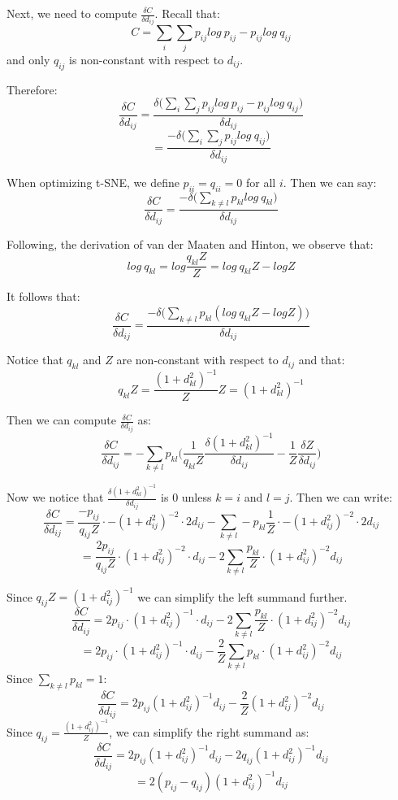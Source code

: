\documentclass[a4paper]{article}
\begin{document}
\begin{enumerate}
{Next, we need to compute $ \frac{\delta C }{\delta d_{ij}} $. Recall that: 
$$C = \sum_i \sum_j p_{ij} log\ p_{ij} - p_{ij} log\ q_{ij}$$
and only $q_{ij}$ is non-constant with respect to $d_{ij}$. 

Therefore: 
$$\frac{ \delta C }{\delta d_{ij} } = \frac{ \delta \Big( \sum_i \sum_j p_{ij} log\ p_{ij} - p_{ij} log\ q_{ij} \Big) }{\delta d_{ij} } $$
$$ = \frac{ - \delta \Big( \sum_i \sum_j p_{ij} log\ q_{ij} \Big) }{\delta d_{ij} } $$

When optimizing t-SNE, we define $p_{ii} = q_{ii} = 0$ for all $i$. Then we can say:
$$\frac{ \delta C }{\delta d_{ij} } = \frac{ - \delta \Big( \sum_{k \neq l} p_{kl} log\ q_{kl} \Big) }{\delta d_{ij} } $$

Following, the derivation of van der Maaten and Hinton, we observe that:
$$log\ q_{kl} = log \frac{q_{kl} Z}{Z} = log\ q_{kl} Z - log Z $$

It follows that:
$$\frac{ \delta C }{\delta d_{ij} } = \frac{ - \delta \Big( \sum_{k \neq l} p_{kl} (log\ q_{kl} Z - log Z) \Big) }{\delta d_{ij} } $$

Notice that $q_{kl}$ and $Z$ are non-constant with respect to $d_{ij}$ and that:
$$q_{kl} Z =  \frac{(1+d_{kl}^2)^{-1} }{  Z } Z = (1+d_{kl}^2)^{-1} $$

Then we can compute $\frac{ \delta C }{\delta d_{ij} }$ as:
$$\frac{ \delta C }{\delta d_{ij} } = - \sum_{k \neq l} p_{kl} \Big( \frac{1}{q_{kl} Z }  \frac{\delta (1+d_{kl}^2)^{-1}  }{\delta d_{ij}} - \frac{1}{Z} \frac{\delta Z }{\delta d_{ij}} \Big) $$

Now we notice that $\frac{\delta (1+d_{kl}^2)^{-1} }{\delta d_{ij}}$ is $0$ unless $k=i$ and $l=j$. Then we can write:
$$\frac{ \delta C }{\delta d_{ij} } =  \frac{ - p_{ij} }{q_{ij} Z } \cdot -  (1+d_{ij}^2)^{-2} \cdot 2 d_{ij} - \sum_{k \neq l} - p_{kl} \frac{1}{Z} \cdot -(1 + d_{ij}^2)^{-2} \cdot 2 d_{ij}$$
$$ =  \frac{  2 p_{ij} }{q_{ij} Z } \cdot (1+d_{ij}^2)^{-2} \cdot d_{ij} - 2 \sum_{k \neq l}  \frac{ p_{kl}}{Z} \cdot (1 + d_{ij}^2)^{-2} d_{ij} $$

Since $q_{ij} Z = (1+d_{ij}^2)^{-1}$ we can simplify the left summand further.
$$\frac{ \delta C }{\delta d_{ij} }  =   2 p_{ij} \cdot (1+d_{ij}^2)^{-1} \cdot d_{ij} - 2 \sum_{k \neq l}  \frac{ p_{kl}}{Z} \cdot (1 + d_{ij}^2)^{-2} d_{ij} $$
$$ =   2 p_{ij} \cdot (1+d_{ij}^2)^{-1} \cdot d_{ij} - \frac{2}{Z} \sum_{k \neq l}  p_{kl} \cdot (1 + d_{ij}^2)^{-2} d_{ij} $$
Since $\sum_{k \neq l} p_{kl} = 1$:
$$\frac{ \delta C }{\delta d_{ij} }  =   2 p_{ij}  (1+d_{ij}^2)^{-1}  d_{ij} - \frac{2}{Z} (1 + d_{ij}^2)^{-2} d_{ij} $$
Since $q_{ij} = \frac{(1+d_{ij}^2)^{-1} }{  Z }$, we can simplify the right summand as:
$$\frac{ \delta C }{\delta d_{ij} }  =   2 p_{ij}  (1+d_{ij}^2)^{-1}  d_{ij} - 2 q_{ij} (1 + d_{ij}^2)^{-1} d_{ij} $$
$$ = 2 (p_{ij} - q_{ij}) (1+d_{ij}^2)^{-1}  d_{ij} $$

}
\end{enumerate}
\end{document}
